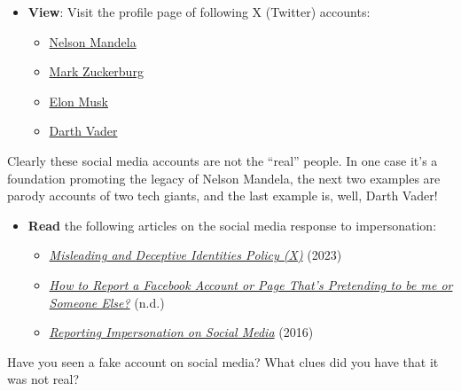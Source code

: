 \documentclass[
  letterpaper,
  DIV=11,
  numbers=noendperiod]{scrreprt}
\providecommand{\tightlist}{%
  \setlength{\itemsep}{0pt}\setlength{\parskip}{0pt}}\usepackage{longtable,booktabs,array}
\begin{document}
\begin{tcolorbox}[enhanced jigsaw, toprule=.15mm, colback=white, colframe=quarto-callout-note-color-frame, bottomtitle=1mm, leftrule=.75mm, coltitle=black, titlerule=0mm, rightrule=.15mm, colbacktitle=quarto-callout-note-color!10!white, left=2mm, title={Learning Activity}, opacitybacktitle=0.6, opacityback=0, breakable, toptitle=1mm, arc=.35mm, bottomrule=.15mm]

\begin{itemize}
\tightlist
\item
  \textbf{View}: Visit the profile page of following X (Twitter)
  accounts:

  \begin{itemize}
  \tightlist
  \item
    \href{https://twitter.com/NelsonMandela}{Nelson Mandela}
  \item
    \href{https://twitter.com/notzuckerberg}{Mark Zuckerburg}
  \item
    \href{https://twitter.com/ElonMuskAOC}{Elon Musk}
  \item
    \href{https://twitter.com/DarthVader}{Darth Vader}
  \end{itemize}
\end{itemize}

Clearly these social media accounts are not the ``real'' people. In one
case it's a foundation promoting the legacy of Nelson Mandela, the next
two examples are parody accounts of two tech giants, and the last
example is, well, Darth Vader!

\begin{itemize}
\tightlist
\item
  \textbf{Read} the following articles on the social media response to
  impersonation:

  \begin{itemize}
  \tightlist
  \item
    \href{https://help.twitter.com/en/rules-and-policies/x-impersonation-and-deceptive-identities-policy}{\emph{Misleading
    and Deceptive Identities Policy (X)}} (2023)
  \item
    \href{https://www.facebook.com/help/174210519303259}{\emph{How to
    Report a Facebook Account or Page That's Pretending to be me or
    Someone Else?}} (n.d.)
  \item
    \href{https://saferinternet.org.uk/blog/reporting-impersonation-on-social-media}{\emph{Reporting
    Impersonation on Social Media}} (2016)
  \end{itemize}
\end{itemize}

Have you seen a fake account on social media? What clues did you have
that it was not real?

\end{tcolorbox}
\end{document}

